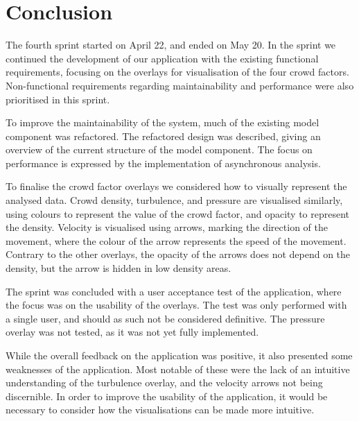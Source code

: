 \section{Conclusion} \label{sec:s4_conclusion}
The fourth sprint started on April 22, and ended on May 20. In the sprint we continued the development of our application with the existing functional requirements, focusing on the overlays for visualisation of the four crowd factors. Non-functional requirements  regarding maintainability and performance were also prioritised in this sprint.

To improve the maintainability of the system, much of the existing model component was refactored. The refactored design was described, giving an overview of the current structure of the model component. The focus on performance is expressed by the implementation of asynchronous analysis.

To finalise the crowd factor overlays we considered how to visually represent the analysed data. Crowd density, turbulence, and pressure are visualised similarly, using colours to represent the value of the crowd factor, and opacity to represent the density. Velocity is visualised using arrows, marking the direction of the movement, where the colour of the arrow represents the speed of the movement. Contrary to the other overlays, the opacity of the arrows does not depend on the density, but the arrow is hidden in low density areas.

The sprint was concluded with a user acceptance test of the application, where the focus was on the usability of the overlays. The test was only performed with a single user, and should as such not be considered definitive. The pressure overlay was not tested, as it was not yet fully implemented.

While the overall feedback on the application was positive, it also presented some weaknesses of the application. Most notable of these were the lack of an intuitive understanding of the turbulence overlay, and the velocity arrows not being discernible. In order to improve the usability of the application, it would be necessary to consider how the visualisations can be made more intuitive.
